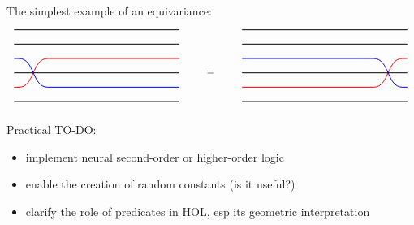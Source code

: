 The simplest example of an equivariance:
\begin{equation}
\begin{tikzpicture}[every path/.style={thick}]
\node[] (x0) at (-3, 0) {};
\node[] (x1) at (-3, 0.5) {};
\node[] (1i) at (-2.7, 0.5) {};
\node[] (1j) at (-1.7, 0.5) {};
\node[] (x2) at (-3, 1) {};
\node[] (x3) at (-3, 1.5) {};
\node[] (3i) at (-2.7, 1.5) {};
\node[] (3j) at (-1.7, 1.5) {};
\node[] (x4) at (-3, 2) {};
\node[] (x5) at (-3, 2.5) {};
\node[] (y0) at (3, 0) {};
\node[] (y1) at (3, 0.5) {};
\node[] (y2) at (3, 1) {};
\node[] (y3) at (3, 1.5) {};
\node[] (y4) at (3, 2) {};
\node[] (y5) at (3, 2.5) {};
\draw (x0) to (y0);
\draw[red] (x1) to (1i.center);
    \draw[red] (1i.center) to[out=0,in=-180] (3j.center);
    \draw[red] (3j.center) to (y3);
\draw (x2) to (y2);
\draw[blue] (x3) to (3i.center);
    \draw[blue] (3i.center) to[out=0,in=-180] (1j.center);
    \draw[blue] (1j.center) to (y1);
\draw (x4) to (y4);
\draw (x5) to (y5);
\end{tikzpicture}
\qquad \raisebox{3em}{=} \qquad
\begin{tikzpicture}[every path/.style={thick}]
\node[] (x0) at (-3, 0) {};
\node[] (x1) at (-3, 0.5) {};
\node[] (1i) at (1.7, 0.5) {};
\node[] (1j) at (2.7, 0.5) {};
\node[] (x2) at (-3, 1) {};
\node[] (x3) at (-3, 1.5) {};
\node[] (3i) at (1.7, 1.5) {};
\node[] (3j) at (2.7, 1.5) {};
\node[] (x4) at (-3, 2) {};
\node[] (x5) at (-3, 2.5) {};
\node[] (y0) at (3, 0) {};
\node[] (y1) at (3, 0.5) {};
\node[] (y2) at (3, 1) {};
\node[] (y3) at (3, 1.5) {};
\node[] (y4) at (3, 2) {};
\node[] (y5) at (3, 2.5) {};
\draw (x0) to (y0);
\draw[red] (x1) to (1i.center);
	\draw[red] (1i.center) to[out=0,in=-180] (3j.center);
	\draw[red] (3j.center) to (y3);
\draw (x2) to (y2);
\draw[blue] (x3) to (3i.center);
	\draw[blue] (3i.center) to[out=0,in=-180] (1j.center);
	\draw[blue] (1j.center) to (y1);
\draw (x4) to (y4);
\draw (x5) to (y5);
\end{tikzpicture}
\end{equation}

Practical TO-DO:
\begin{itemize}
	\item implement neural second-order or higher-order logic
	\item enable the creation of random constants (is it useful?)
	\item clarify the role of predicates in HOL, esp its geometric interpretation
\end{itemize}

